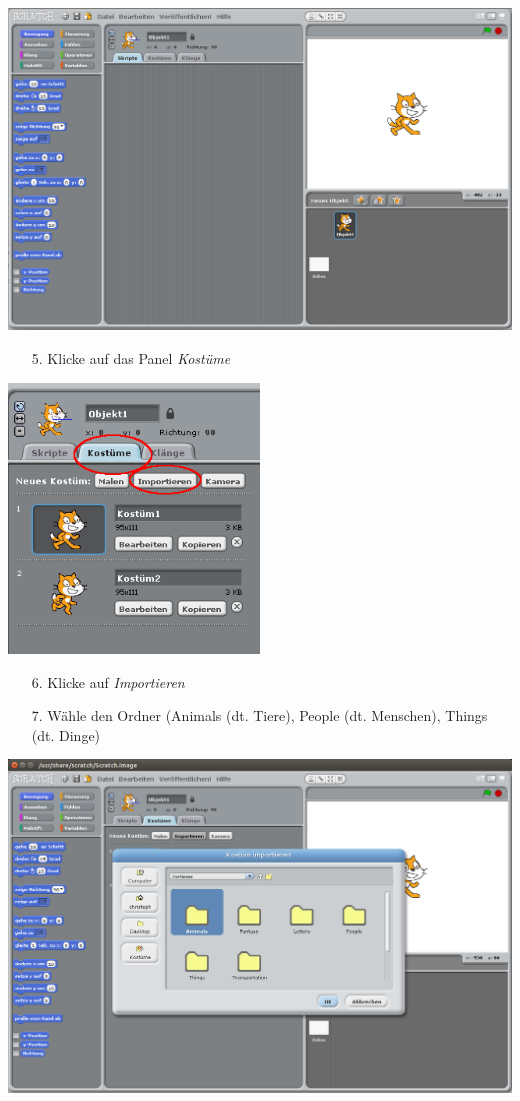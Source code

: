\includegraphics[width=\textwidth]{images/aufgabe1_start.png}

\begin{itemize}
\item[5.] Klicke auf das Panel \textit{Kostüme}
\end{itemize}

\includegraphics[width=0.5\textwidth]{images/aufgabe1_kostueme.png}

\begin{itemize}
\item[6.] Klicke auf \textit{Importieren}
\item[7.] Wähle den Ordner (Animals (dt. Tiere), People (dt. Menschen), Things (dt. Dinge)
\end{itemize}

\includegraphics[width=\textwidth]{images/aufgabe1_ordner.png}

